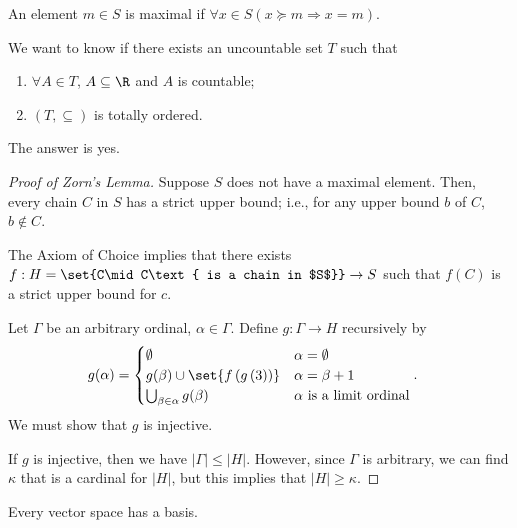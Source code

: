 \documentclass[10pt]{mypackage}
\begin{document}
\begin{definition}
  An element $m\in S$ is maximal if $\forall x\in S \left(x\succeq m \Rightarrow x = m\right)$.
\end{definition}
\begin{example}
  We want to know if there exists an uncountable set $T$ such that
  \begin{enumerate}[(1)]
    \item $\forall A\in T$, $A\subseteq \R$ and $A$ is countable;
    \item $ \left(T,\subseteq\right) $ is totally ordered.
  \end{enumerate}
  The answer is yes.
\end{example}
\begin{proof}[Proof of Zorn's Lemma]
  Suppose $S$ does not have a maximal element. Then, every chain $C$ in $S$ has a strict upper bound; i.e., for any upper bound $b$ of $C$, $b\notin C$.\newline

  The Axiom of Choice implies that there exists $f: H = \set{C\mid C\text{ is a chain in $S$}}\rightarrow S$ such that $f(C)$ is a strict upper bound for $c$.\newline

  Let $\Gamma$ be an arbitrary ordinal, $\alpha \in \Gamma$. Define $g: \Gamma \rightarrow H$ recursively by
  \begin{align*}
    g(\alpha) &= \begin{cases}
      \emptyset & \alpha = \emptyset\\
      g(\beta) \cup \set{f\left(g\left(3\right)\right)}& \alpha = \beta + 1\\
      \bigcup_{\beta\in\alpha}g(\beta)& \alpha\text{ is a limit ordinal}
    \end{cases}.
  \end{align*}
  We must show that $g$ is injective.\newline

  If $g$ is injective, then we have $\left\vert \Gamma \right\vert\leq \left\vert H \right\vert$. However, since $\Gamma$ is arbitrary, we can find $\kappa$ that is a cardinal for $\left\vert H \right\vert$, but this implies that $\left\vert H \right\vert \geq \kappa$.
\end{proof}
  \begin{theorem}
    Every vector space has a basis.
  \end{theorem}
\end{document}
